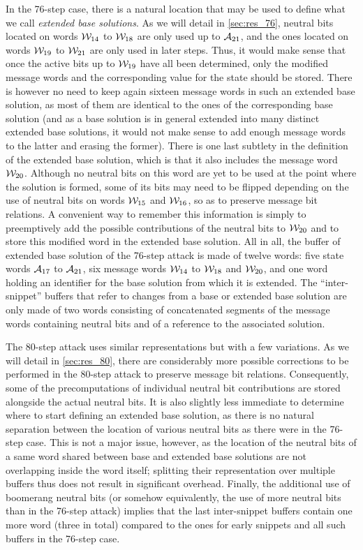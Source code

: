 In the 76-step case, there is a natural location that may be used to define what we call \emph{extended base solutions}. As we will detail in
\autoref{sec:res_76}, neutral bits located on words $\mathcal{W}_{14}$ to $\mathcal{W}_{18}$ are only used up to $\mathcal{A}_{21}$, and the ones located
on words $\mathcal{W}_{19}$ to $\mathcal{W}_{21}$ are only used in later steps. Thus, it would make sense that once the active bits up to
$\mathcal{W}_{19}$ have all been determined, only the modified message words and the corresponding value for the state should be stored. There is
however no need to keep again sixteen message words in such an extended base solution, as most of them are identical to the ones of the corresponding
base solution (and as a base solution is in general extended into many distinct extended base solutions, it would not make sense to \eg add enough
message words to the latter and erasing the former). There is one last subtlety in the definition of the extended base solution, which is that
it also includes the message word $\mathcal{W}_{20}$. Although no neutral bits on this word are yet to be used at the point where the solution is
formed, some of its bits may need to be flipped depending on the use of neutral bits on words $\mathcal{W}_{15}$ and $\mathcal{W}_{16}$, so as to
preserve message bit relations. A convenient way to remember this information is simply to preemptively add the possible contributions of the neutral
bits to $\mathcal{W}_{20}$ and to store this modified word in the extended base solution.
All in all, the buffer of extended base solution of the 76-step attack is made of twelve words: five state words $\mathcal{A}_{17}$ to $\mathcal{A}_{21}$,
six message words $\mathcal{W}_{14}$ to $\mathcal{W}_{18}$ and $\mathcal{W}_{20}$, and one word holding an identifier for the base solution from which
it is extended.
The ``inter-snippet'' buffers that refer to changes from a base or extended base solution are only made of two words consisting of concatenated
segments of the message words containing neutral bits and of a reference to the associated solution.

The 80-step attack uses similar representations but with a few variations. As we will detail in \autoref{sec:res_80}, there are considerably
more possible corrections to be performed in the 80-step attack to preserve message bit relations. Consequently, some of the precomputations of
individual neutral bit contributions are stored alongside the actual neutral bits. It is also slightly less immediate to determine where to
start defining an extended base solution, as there is no natural separation between the location of various neutral bits as there were in
the 76-step case. This is not a major issue, however, as the location of the neutral bits of a same word shared between base and extended base solutions
are not overlapping inside the word itself; splitting their representation over multiple buffers thus does not result in significant overhead.
Finally, the additional use of boomerang neutral bits (or somehow equivalently, the use of more neutral bits than in the 76-step attack)
implies that the last inter-snippet buffers contain one more word (\ie three in total) compared to the ones for early snippets and all such buffers
in the 76-step case.

